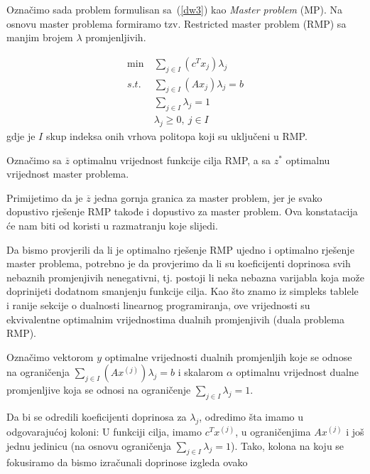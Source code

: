 \documentclass[a4paper, utf8, 11pt, colorlinks]{book}
\begin{document}
 Označimo sada problem formulisan  sa~(\ref{dw3}) kao \emph{Master problem} (MP). Na osnovu master problema formiramo tzv. Restricted master problem (RMP)  sa manjim brojem $\lambda$ promjenljivih.
 
     \begin{equation}
 	\begin{aligned}\label{dw4}
 		\min\  & \sum_{j\in I}(c^T x_j)\lambda_j\\
 		s.t.\  &\sum_{j\in I} (A x_j)\lambda_j=b\\
 		&\sum_{j\in I}\lambda_j = 1\\
 		&\lambda_j\geqslant 0,\ j  \in I
 	\end{aligned}
 \end{equation}
gdje je $I$ skup indeksa onih vrhova politopa koji su uključeni u RMP.

Označimo sa $\overline{z}$ optimalnu vrijednost funkcije cilja RMP, a sa $z^*$ optimalnu vrijednost master problema.

Primijetimo da je $\overline{z}$ jedna gornja granica za master problem, jer je svako dopustivo rješenje RMP takođe i dopustivo za master problem. Ova konstatacija će nam biti od koristi u razmatranju koje slijedi.

Da bismo provjerili da li je optimalno rješenje RMP ujedno i optimalno rješenje master problema, potrebno je da provjerimo da li su koeficijenti doprinosa svih nebaznih promjenjivih nenegativni, tj. postoji li neka nebazna varijabla koja može doprinijeti dodatnom smanjenju funkcije cilja. Kao što znamo iz simpleks tablele i ranije sekcije o dualnosti linearnog programiranja, ove vrijednosti su ekvivalentne optimalnim vrijednostima dualnih promjenjivih (duala problema RMP).   



Označimo vektorom $y$ optimalne vrijednosti dualnih promjenljih koje se odnose na ograničenja $\sum_{j\in I} (A x^{(j)})\lambda_j=b$ i skalarom $\alpha$ optimalnu vrijednost dualne promjenljive koja se odnosi na ograničenje $\sum_{j\in I}\lambda_j = 1$. 

Da bi se odredili   koeficijenti doprinosa za $\lambda_j$, odredimo šta imamo u odgovarajućoj koloni: U funkciji cilja, imamo $c^Tx^{(j)}$, u ograničenjima $A x^{(j)} $ i još jednu jedinicu (na osnovu ograničenja $\sum_{j\in I}\lambda_j = 1$). Tako, kolona na koju se fokusiramo da bismo izračunali doprinose izgleda ovako
\end{document}
